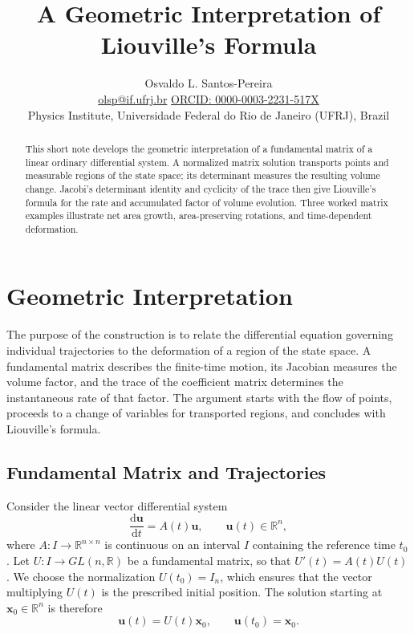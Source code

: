 \documentclass[10pt,a4paper]{article}
\title{\vspace{-1.5em}\textbf{A Geometric Interpretation of Liouville's Formula}}
\author{Osvaldo L. Santos-Pereira\\[-1pt]
\small \href{mailto:olsp@if.ufrj.br}{olsp@if.ufrj.br}\quad\textbullet\quad
\href{https://orcid.org/0000-0003-2231-517X}{ORCID: 0000-0003-2231-517X}\\[2pt]
\small Physics Institute, Universidade Federal do Rio de Janeiro (UFRJ), Brazil}
\date{}
\newcommand{\R}{\mathbb{R}}
\newcommand{\dd}{\mathrm{d}}
\numberwithin{equation}{section}
\theoremstyle{definition}
\begin{document}
\maketitle
\vspace{-2.1em}

\begin{abstract}
This short note develops the geometric interpretation of a fundamental matrix of a linear ordinary differential system. A normalized matrix solution transports points and measurable regions of the state space; its determinant measures the resulting volume change. Jacobi's determinant identity and cyclicity of the trace then give Liouville's formula for the rate and accumulated factor of volume evolution. Three worked matrix examples illustrate net area growth, area-preserving rotations, and time-dependent deformation.
\end{abstract}

\section{Geometric Interpretation}

The purpose of the construction is to relate the differential equation governing individual trajectories to the deformation of a region of the state space. A fundamental matrix describes the finite-time motion, its Jacobian measures the volume factor, and the trace of the coefficient matrix determines the instantaneous rate of that factor. The argument starts with the flow of points, proceeds to a change of variables for transported regions, and concludes with Liouville's formula.

\subsection{Fundamental Matrix and Trajectories}

Consider the linear vector differential system
\begin{equation}
\frac{\dd\mathbf{u}}{\dd t}=A(t)\mathbf{u},\qquad
\mathbf{u}(t)\in\R^n,
\label{eq:linear-system}
\end{equation}
where $A:I\to\R^{n\times n}$ is continuous on an interval $I$ containing the reference time $t_0$. Let $U:I\to GL(n,\R)$ be a fundamental matrix, so that $U'(t)=A(t)U(t)$. We choose the normalization $U(t_0)=I_n$, which ensures that the vector multiplying $U(t)$ is the prescribed initial position. The solution starting at $\mathbf{x}_0\in\R^n$ is therefore
\begin{equation}
\mathbf{u}(t)=U(t)\mathbf{x}_0,\qquad \mathbf{u}(t_0)=\mathbf{x}_0.
\label{eq:trajectory}
\end{equation}
\end{document}
